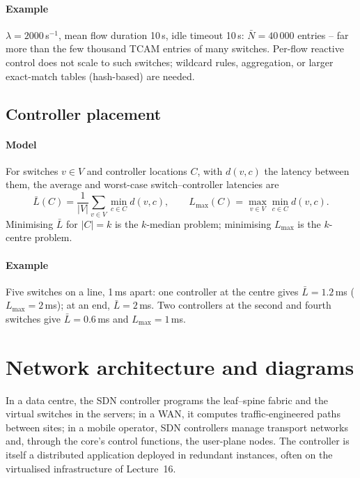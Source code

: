 \documentclass[11pt,a4paper]{article}
\begin{document}
\paragraph{Example} $\lambda = 2000$\,s$^{-1}$, mean flow duration 10\,s, idle timeout 10\,s: $\bar N = 40\,000$
entries -- far more than the few thousand TCAM entries of many switches. Per-flow reactive control does not
scale to such switches; wildcard rules, aggregation, or larger exact-match tables (hash-based) are needed.

\subsection{Controller placement}\label{sec:place}
\paragraph{Model} For switches $v\in V$ and controller locations $C$, with $d(v,c)$ the latency between them,
the average and worst-case switch--controller latencies are
\begin{equation}\label{eq:place}
  \bar L(C) = \frac{1}{|V|}\sum_{v\in V}\min_{c\in C} d(v,c), \qquad
  L_{\max}(C) = \max_{v\in V}\min_{c\in C} d(v,c).
\end{equation}
Minimising $\bar L$ for $|C| = k$ is the $k$-median problem; minimising $L_{\max}$ is the $k$-centre problem.
\paragraph{Example} Five switches on a line, 1\,ms apart: one controller at the centre gives $\bar L = 1.2$\,ms
($L_{\max} = 2$\,ms); at an end, $\bar L = 2$\,ms. Two controllers at the second and fourth switches give
$\bar L = 0.6$\,ms and $L_{\max} = 1$\,ms.

\section{Network architecture and diagrams}
In a data centre, the SDN controller programs the leaf--spine fabric and the virtual switches in the
servers; in a WAN, it computes traffic-engineered paths between sites; in a mobile operator, SDN controllers
manage transport networks and, through the core's control functions, the user-plane nodes. The controller is
itself a distributed application deployed in redundant instances, often on the virtualised infrastructure
of Lecture~16.
\end{document}
